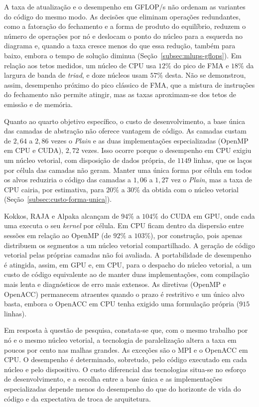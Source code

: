A taxa de atualização e o desempenho em GFLOP/s não ordenam as variantes do código do mesmo modo.
As decisões que eliminam operações redundantes, como a fatoração do fechamento e a forma de produto do equilíbrio, reduzem o número de operações por nó e deslocam o ponto do núcleo para a esquerda no diagrama e, quando a taxa cresce menos do que essa redução, também para baixo, embora o tempo de solução diminua (Seção~\ref{subsec:mlups-gflops}).
Em relação aos tetos medidos, um núcleo de CPU usa \(12\%\) do pico de FMA e \(18\%\) da largura de banda de \textit{triad}, e doze núcleos usam \(57\%\) desta.
Não se demonstrou, assim, desempenho próximo do pico clássico de FMA, que a mistura de instruções do fechamento não permite atingir, mas as taxas aproximam-se dos tetos de emissão e de memória.

Quanto ao quarto objetivo específico, o custo de desenvolvimento, a base única das camadas de abstração não oferece vantagem de código.
As camadas custam de \(2{,}64\) a \(2{,}86\) vezes o \textit{Plain} e as duas implementações especializadas (OpenMP em CPU e CUDA), \(2{,}72\) vezes.
Isso ocorre porque o desempenho em CPU exigiu um núcleo vetorial, com disposição de dados própria, de \(1149\) linhas, que os laços por célula das camadas não geram.
Manter uma única forma por célula em todos os alvos reduziria o código das camadas a \(1{,}06\) a \(1{,}27\) vez o \textit{Plain}, mas a taxa de CPU cairia, por estimativa, para \(20\%\) a \(30\%\) da obtida com o núcleo vetorial (Seção~\ref{subsec:custo-forma-unica}).

Kokkos, RAJA e Alpaka alcançam de \(94\%\) a \(104\%\) do CUDA em GPU, onde cada uma executa o seu \textit{kernel} por célula.
Em CPU ficam dentro da dispersão entre sessões em relação ao OpenMP (de \(92\%\) a \(103\%\)), por construção, pois apenas distribuem os segmentos a um núcleo vetorial compartilhado.
A geração de código vetorial pelas próprias camadas não foi avaliada.
A portabilidade de desempenho é atingida, assim, em GPU e, em CPU, para o despacho do núcleo vetorial, a um custo de código equivalente ao de manter duas implementações, com compilação mais lenta e diagnósticos de erro mais extensos.
As diretivas (OpenMP e OpenACC) permanecem atraentes quando o prazo é restritivo e um único alvo basta, embora o OpenACC em CPU tenha exigido uma formulação própria (\(915\) linhas).

Em resposta à questão de pesquisa, constata-se que, com o mesmo trabalho por nó e o mesmo núcleo vetorial, a tecnologia de paralelização altera a taxa em poucos por cento nas malhas grandes.
As exceções são o MPI e o OpenACC em CPU.
O desempenho é determinado, sobretudo, pelo código executado em cada núcleo e pelo dispositivo.
O custo diferencial das tecnologias situa-se no esforço de desenvolvimento, e a escolha entre a base única e as implementações especializadas depende menos do desempenho do que do horizonte de vida do código e da expectativa de troca de arquitetura.

